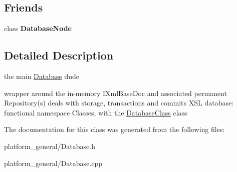 \subsection*{\-Friends}
\begin{DoxyCompactItemize}
\item 
\hypertarget{classgeneral__server_1_1Database_ab8ac4f803679730520f3966cfeaca91a}{class {\bfseries \-Database\-Node}}\label{classgeneral__server_1_1Database_ab8ac4f803679730520f3966cfeaca91a}

\end{DoxyCompactItemize}


\subsection{\-Detailed \-Description}
the main \hyperlink{classgeneral__server_1_1Database}{\-Database} dude 

wrapper around the in-\/memory \-I\-Xml\-Base\-Doc and associated permanent \-Repository(s) deals with storage, transactions and commits \-X\-S\-L database\-: functional namespace \-Classes, with the \hyperlink{classgeneral__server_1_1DatabaseClass}{\-Database\-Class} class 

\-The documentation for this class was generated from the following files\-:\begin{DoxyCompactItemize}
\item 
platform\-\_\-general/\-Database.\-h\item 
platform\-\_\-general/\-Database.\-cpp\end{DoxyCompactItemize}
